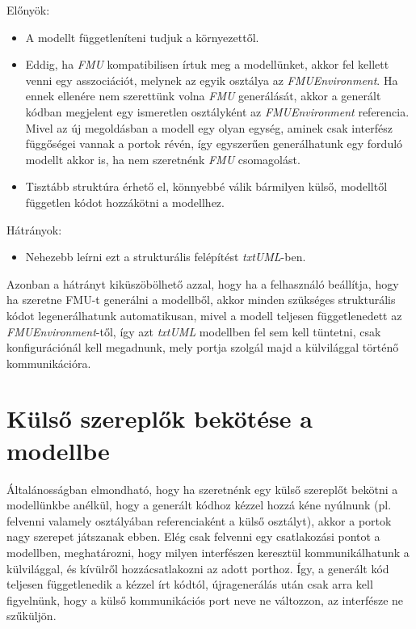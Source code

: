 \documentclass[a4paper,12pt]{report}
\begin{document}
Előnyök: \\
\begin{itemize}
\item A modellt függetleníteni tudjuk a környezettől.
\item  Eddig, ha \textit{FMU} kompatibilisen írtuk meg a modellünket, akkor fel kellett venni egy asszociációt, melynek az egyik osztálya az \textit{FMUEnvironment}. Ha ennek ellenére nem szerettünk volna  \textit{FMU} generálását, akkor a generált kódban megjelent egy ismeretlen osztályként az \textit{FMUEnvironment} referencia. Mivel az új megoldásban a modell egy olyan egység, aminek csak interfész függőségei vannak a portok révén, így egyszerűen generálhatunk egy forduló modellt akkor is, ha nem szeretnénk \textit{FMU} csomagolást.
\item Tisztább struktúra érhető el, könnyebbé válik bármilyen külső, modelltől független kódot hozzákötni a modellhez. 
\end{itemize}
Hátrányok: \\
\begin{itemize}
\item Nehezebb leírni ezt a strukturális felépítést \textit{txtUML}-ben.
\end{itemize}
Azonban a hátrányt kiküszöbölhető azzal, hogy ha a felhasználó beállítja, hogy ha szeretne FMU-t generálni a modellből, akkor minden szükséges strukturális kódot legenerálhatunk automatikusan, mivel a modell teljesen függetlenedett az \textit{FMUEnvironment}-től, így azt \textit{txtUML} modellben fel sem kell tüntetni, csak konfigurációnál kell megadnunk, mely portja szolgál majd a külvilággal történő kommunikációra.

\section{Külső szereplők bekötése a modellbe}
Általánosságban elmondható, hogy ha szeretnénk egy külső szereplőt bekötni a modellünkbe anélkül, hogy a generált kódhoz kézzel hozzá kéne nyúlnunk (pl. felvenni valamely osztályában referenciaként a külső osztályt), akkor a portok nagy szerepet játszanak ebben. Elég csak felvenni egy csatlakozási pontot a modellben, meghatározni, hogy milyen interfészen keresztül kommunikálhatunk a külvilággal, és kívülről hozzácsatlakozni az adott porthoz. Így, a generált kód teljesen függetlenedik a kézzel írt kódtól, újragenerálás után csak arra kell figyelnünk, hogy a külső kommunikációs port neve ne változzon, az interfésze ne szűküljön. \\
\end{document}
